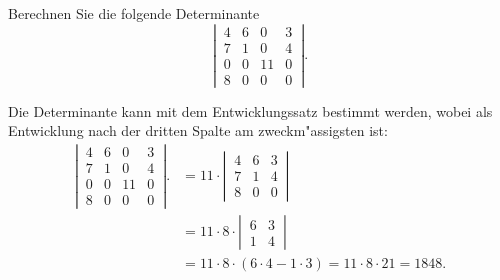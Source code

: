 Berechnen Sie die folgende Determinante
\[
\left|\,\begin{matrix}
4&6& 0&3\\
7&1& 0&4\\
0&0&11&0\\
8&0& 0&0
\end{matrix}\,\right|.
\]



\begin{loesung}
Die Determinante kann mit dem Entwicklungssatz bestimmt werden, wobei
als Entwicklung nach der dritten Spalte am zweckm"assigsten ist:
\begin{align*}
\left|\,\begin{matrix}
4&6& 0&3\\
7&1& 0&4\\
0&0&11&0\\
8&0& 0&0
\end{matrix}\,\right|.
&=
11\cdot
\left|\,\begin{matrix}
4&6&3\\
7&1&4\\
8&0&0
\end{matrix}\,\right|
\\
&=
11\cdot
8\cdot
\left|\,\begin{matrix}
6&3\\
1&4
\end{matrix}\,\right|
\\
&=
11\cdot
8\cdot
(6\cdot 4-1\cdot 3)=11\cdot 8\cdot 21=1848.
\end{align*}
\end{loesung}

